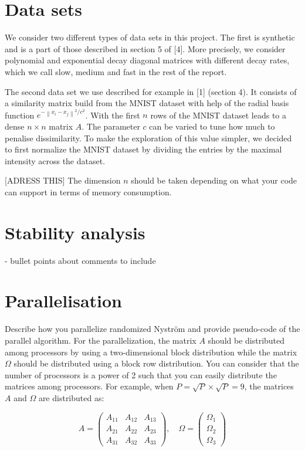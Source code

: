 \documentclass[a4paper, 12pt,oneside]{article}
\begin{document}
	\section{Data sets}
	We consider two different types of data sets in this project. The first is synthetic and is a part of those described in section 5 of [4]. More precisely, we consider polynomial and exponential decay diagonal matrices with different decay rates, which we call slow, medium and fast in the rest of the report.
	
	The second data set we use  described for example in [1] (section 4). It consists of a similarity matrix build from the MNIST dataset with help of the radial basis function $e^{-\left\|x_i-x_j\right\|^2 / c^2}$. With the first $n$ rows of the MNIST dataset leads to a dense $n\times n$ matrix $A$. The parameter $c$ can be varied to tune how much to penalise dissimilarity. To make the exploration of this value simpler, we decided to first normalize the MNIST dataset by dividing the entries by the maximal intensity across the dataset. 
	
	[ADRESS THIS] The dimension $n$ should be taken depending on what your code can support in terms of memory consumption.
	\section{Stability analysis}
		- bullet points about comments to include 
	\section{Parallelisation}
	Describe how you parallelize randomized Nyström and provide pseudo-code of the parallel algorithm. For the parallelization, the matrix $A$ should be distributed among processors by using a two-dimensional block distribution while the matrix $\Omega$ should be distributed using a block row distribution. You can consider that the number of processors is a power of 2 such that you can easily distribute the matrices among processors. For example, when $P=\sqrt{P} \times \sqrt{P}=9$, the matrices $A$ and $\Omega$ are distributed as:

	$$
	A=\left(\begin{array}{lll}
	A_{11} & A_{12} & A_{13} \\
	A_{21} & A_{22} & A_{23} \\
	A_{31} & A_{32} & A_{33}
	\end{array}\right), \quad \Omega=\left(\begin{array}{l}
	\Omega_1 \\
	\Omega_2 \\
	\Omega_3
	\end{array}\right)
	$$
\end{document}

